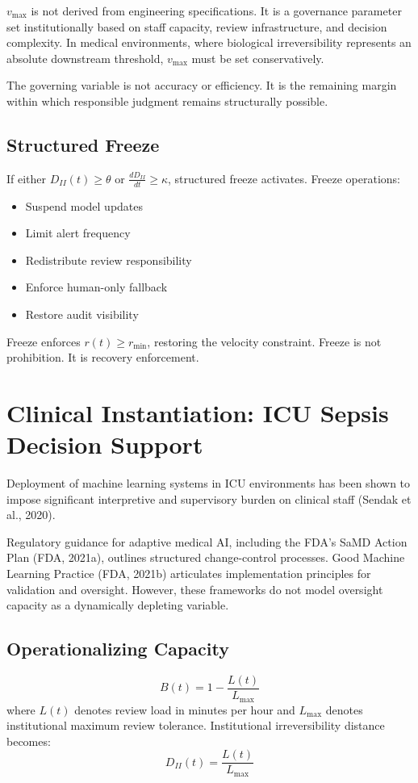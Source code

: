 \documentclass[12pt]{article}
\begin{document}
$v_{\max}$ is not derived from engineering specifications. It is a governance parameter set
institutionally based on staff capacity, review infrastructure, and decision complexity.
In medical environments, where biological irreversibility represents an absolute downstream
threshold, $v_{\max}$ must be set conservatively.

The governing variable is not accuracy or efficiency. It is the remaining margin within
which responsible judgment remains structurally possible.

\subsection{Structured Freeze}

If either $D_{II}(t) \geq \theta$ or $\frac{dD_{II}}{dt} \geq \kappa$, structured freeze
activates. Freeze operations:

\begin{itemize}[leftmargin=1.5em]
  \item Suspend model updates
  \item Limit alert frequency
  \item Redistribute review responsibility
  \item Enforce human-only fallback
  \item Restore audit visibility
\end{itemize}

Freeze enforces $r(t) \geq r_{\min}$, restoring the velocity constraint.
Freeze is not prohibition. It is recovery enforcement.

\section{Clinical Instantiation: ICU Sepsis Decision Support}

Deployment of machine learning systems in ICU environments has been shown to impose
significant interpretive and supervisory burden on clinical staff (Sendak et al., 2020).

Regulatory guidance for adaptive medical AI, including the FDA's SaMD Action Plan
(FDA, 2021a), outlines structured change-control processes. Good Machine Learning
Practice (FDA, 2021b) articulates implementation principles for validation and oversight.
However, these frameworks do not model oversight capacity as a dynamically depleting variable.

\subsection{Operationalizing Capacity}
\[
B(t) = 1 - \frac{L(t)}{L_{\max}}
\]
where $L(t)$ denotes review load in minutes per hour and $L_{\max}$ denotes institutional
maximum review tolerance. Institutional irreversibility distance becomes:
\[
D_{II}(t) = \frac{L(t)}{L_{\max}}
\]
\end{document}
